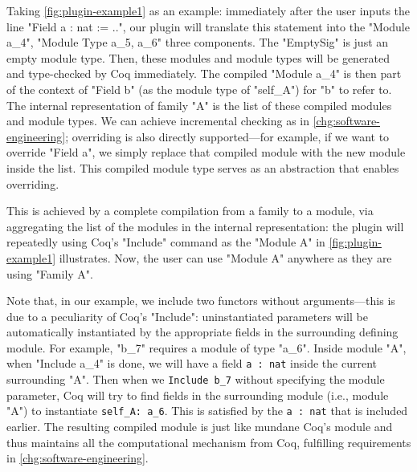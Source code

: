 Taking \cref{fig:plugin-example1} as an example: immediately after the user inputs the line "Field a : nat := ..", our plugin will
translate this statement into the "Module a_4", "Module Type a_5, a_6"
three components.
{The "EmptySig" is just an empty module type.} Then,
these modules and module types will be generated and type-checked by Coq
immediately. The compiled "Module a_4" is then part of the context of
"Field b" (as the module type of "self_A") for "b" to refer to. The
internal representation of family "A" is the list of these
compiled modules and module types. We can achieve incremental
checking as in \ref{chg:software-engineering}; overriding is also directly supported---for example, if we
want to override "Field a", we simply replace that compiled module with
the new module inside the list. This compiled module type serves as an
abstraction that enables overriding. 



 This is achieved by a complete compilation from a family to a module, via aggregating the list of the modules in the internal representation: the plugin will repeatedly using Coq's "Include" command as the "Module A" in \cref{fig:plugin-example1} illustrates. Now, the user can use "Module A" anywhere as they are using "Family A".

Note that, in our example, we include two
functors without arguments---this is due to a peculiarity of Coq's
"Include": uninstantiated parameters will be automatically
instantiated by the appropriate fields in the surrounding defining
module.
For example, "b_7" requires a module of type "a_6". Inside module "A",
when "Include a_4" is done, we will have a field \texttt{a : nat}
inside the current surrounding "A". Then when we
\texttt{Include b_7} without specifying the module parameter,
Coq will try to find fields in the surrounding module (i.e., module
"A") to instantiate \texttt{self_A: a_6}. This is satisfied by
the \texttt{a : nat} that is included earlier.
The resulting compiled module is just like mundane Coq's module and 
thus maintains all the computational mechanism from Coq, fulfilling requirements in \ref{chg:software-engineering}. 



